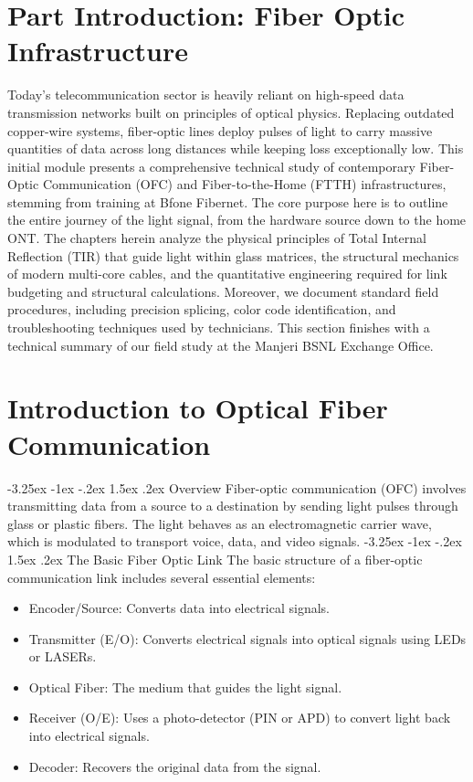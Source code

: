 \documentclass[11pt,a4paper]{report}
\makeatletter
\renewcommand{\section}{\@startsection{section}{1}{\z@}%
  {-3.25ex \@plus -1ex \@minus -.2ex}%
  {1.5ex \@plus.2ex}%
  {\normalfont\Large\bfseries\color{primaryColor}}}
\makeatother
\begin{document}
\chapter*{Part Introduction: Fiber Optic Infrastructure}
Today's telecommunication sector is heavily reliant on high-speed data transmission networks built on principles of optical physics. Replacing outdated copper-wire systems, fiber-optic lines deploy pulses of light to carry massive quantities of data across long distances while keeping loss exceptionally low. This initial module presents a comprehensive technical study of contemporary Fiber-Optic Communication (OFC) and Fiber-to-the-Home (FTTH) infrastructures, stemming from training at Bfone Fibernet. The core purpose here is to outline the entire journey of the light signal, from the hardware source down to the home ONT. The chapters herein analyze the physical principles of Total Internal Reflection (TIR) that guide light within glass matrices, the structural mechanics of modern multi-core cables, and the quantitative engineering required for link budgeting and structural calculations. Moreover, we document standard field procedures, including precision splicing, color code identification, and troubleshooting techniques used by technicians. This section finishes with a technical summary of our field study at the Manjeri BSNL Exchange Office.
\chapter{Introduction to Optical Fiber Communication}
\section{Overview}
Fiber-optic communication (OFC) involves transmitting data from a source to a destination by sending light pulses through glass or plastic fibers. The light behaves as an electromagnetic carrier wave, which is modulated to transport voice, data, and video signals.
\section{The Basic Fiber Optic Link}
The basic structure of a fiber-optic communication link includes several essential elements:
\begin{itemize}
  \item Encoder/Source: Converts data into electrical signals.
  \item Transmitter (E/O): Converts electrical signals into optical signals using LEDs or LASERs.
  \item Optical Fiber: The medium that guides the light signal.
  \item Receiver (O/E): Uses a photo-detector (PIN or APD) to convert light back into electrical signals.
  \item Decoder: Recovers the original data from the signal.
\end{itemize}
\end{document}

